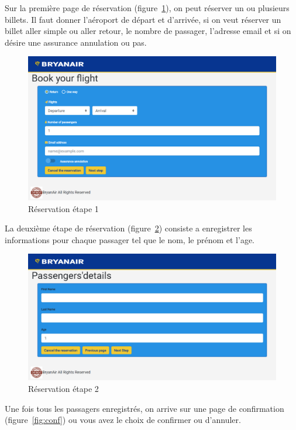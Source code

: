 \documentclass[12pt,a4paper]{article}
\begin{document}
		Sur la première page de réservation (figure~\ref{fig:res1}), on peut réserver un ou plusieurs billets. Il faut donner l'aéroport de départ et d'arrivée, si on veut réserver un billet aller simple ou aller retour, le nombre de passager, l'adresse email et si on désire une assurance annulation ou pas.
		\begin{figure}
      \includegraphics[width=\textwidth]{Reservation.png}
			\caption{Réservation étape 1}
			\label{fig:res1}
		\end{figure}

		La deuxième étape de réservation (figure~\ref{fig:res2}) consiste a enregistrer les informations pour chaque passager tel que le nom, le prénom et l'age.
		\begin{figure}
      \includegraphics[width=\textwidth]{Detail.png}
			\caption{Réservation étape 2}
			\label{fig:res2}
		\end{figure}

		Une fois tous les passagers enregistrés, on arrive sur une page de confirmation (figure~\ref{fig:conf}) ou vous avez le choix de confirmer ou d'annuler.
\end{document}

